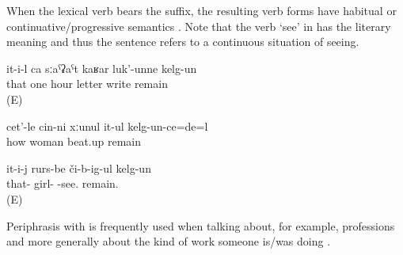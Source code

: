 When the lexical verb bears the  suffix, the resulting verb forms have habitual or continuative\slash progressive semantics . Note that the verb `see' in  has the literary meaning and thus the sentence refers to a continuous situation of seeing.
%
\begin{exe}
	\ex	\label{ex:‎He wrote the letter in one hour}
	\gll	it-i-l	ca	sːaˁʡaˁt	kaʁar	luk'-unne	kelg-un\\
		that	one	hour	letter	write	remain\\
	\glt	{} (E)

	\ex	\label{ex:[When the man was in prison he remembered a lot], how he constantly beat up his wife}
	\gll	cet'-le	cin-ni	xːunul	it-ul	kelg-un-ce=de=l\\
		how		woman	beat.up	remain\\
	\glt	{}

	\ex	\label{‎‎He was seeing the girls.}
	\gll it-i-j	rurs-be	či-b-ig-ul	kelg-un\\
	that-	girl-	-see.	remain.\\
	\glt {} (E)
\end{exe}
	
Periphrasis with  is frequently used when talking about, for example, professions and more generally about the kind of work someone is/was doing .	
	

